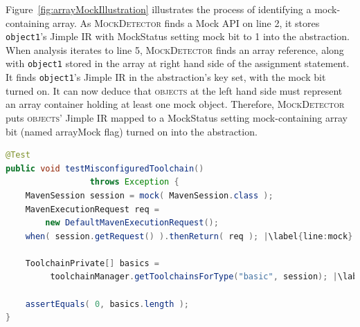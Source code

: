 Figure~\ref{fig:arrayMockIllustration} illustrates the process of identifying a mock-containing array. As \textsc{MockDetector} finds a Mock API on line 2, it stores \texttt{object1}'s Jimple IR with MockStatus setting mock bit to 1 into the abstraction. When analysis iterates to line 5, \textsc{MockDetector} finds an array reference, along with \texttt{object1} stored in the array at right hand side of the assignment statement. It finds \texttt{object1}'s Jimple IR in the abstraction's key set, with the mock bit turned on. It can now deduce that \textsc{objects} at the left hand side must represent an array container holding at least one mock object. Therefore, \textsc{MockDetector} puts \textsc{objects}' Jimple IR mapped to a MockStatus setting mock-containing array bit (named arrayMock flag) turned on into the abstraction. 


\begin{lstlisting}[basicstyle=\ttfamily, caption={This code snippet illustrates an example from maven-core, where calls to both the focal method \texttt{getToolchainsForType()} and to mocked \texttt{getRequest()} occur in test \textit{testMisconfiguredToolchain()}},
basicstyle=\scriptsize\ttfamily,language = Java, framesep=4.5mm, escapechar=|,
framexleftmargin=1.0mm, captionpos=b, xleftmargin=3.5ex, label=lis:mockCall]
@Test
public void testMisconfiguredToolchain()
                 throws Exception {
    MavenSession session = mock( MavenSession.class );
    MavenExecutionRequest req = 
        new DefaultMavenExecutionRequest();
    when( session.getRequest() ).thenReturn( req ); |\label{line:mock}|
    
    ToolchainPrivate[] basics =
         toolchainManager.getToolchainsForType("basic", session); |\label{line:real}|
    
    assertEquals( 0, basics.length );
}
\end{lstlisting}

